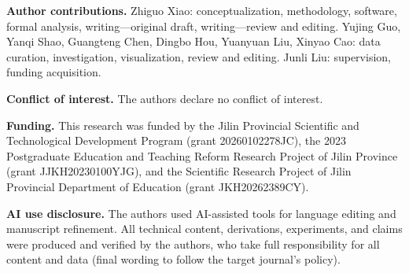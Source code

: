 \documentclass[journal]{IEEEtran}
\begin{document}
\textbf{Author contributions.} Zhiguo Xiao: conceptualization, methodology, software, formal analysis, writing---original draft, writing---review and editing. Yujing Guo, Yanqi Shao, Guangteng Chen, Dingbo Hou, Yuanyuan Liu, Xinyao Cao: data curation, investigation, visualization, review and editing. Junli Liu: supervision, funding acquisition.

\textbf{Conflict of interest.} The authors declare no conflict of interest.

\textbf{Funding.} This research was funded by the Jilin Provincial Scientific and Technological Development Program (grant 20260102278JC), the 2023 Postgraduate Education and Teaching Reform Research Project of Jilin Province (grant JJKH20230100YJG), and the Scientific Research Project of Jilin Provincial Department of Education (grant JKH20262389CY).

\textbf{AI use disclosure.} The authors used AI-assisted tools for language editing and manuscript refinement. All technical content, derivations, experiments, and claims were produced and verified by the authors, who take full responsibility for all content and data (final wording to follow the target journal's policy).



\end{document}
